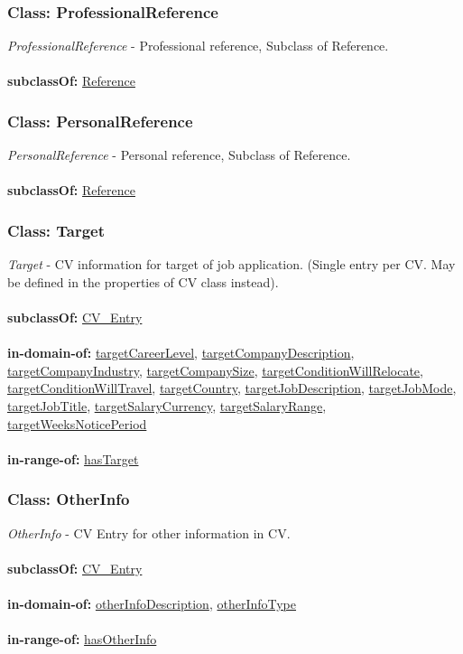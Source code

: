\documentclass[a4paper,12pt]{article}
\numberwithin{equation}{section}
\begin{document}
\subsubsection{Class: ProfessionalReference}\hypertarget{ProfessionalReference}{}
\textit{ProfessionalReference} - Professional reference, Subclass of Reference.
\\\\
\textbf{subclassOf:} \hyperlink{Reference}{Reference}

\subsubsection{Class: PersonalReference}\hypertarget{PersonalReference}{}
\textit{PersonalReference} - Personal reference, Subclass of Reference.
\\\\
\textbf{subclassOf:} \hyperlink{Reference}{Reference}

\subsubsection{Class: Target}\hypertarget{Target}{}
\textit{Target} - CV information for target of job application. (Single entry per CV. May be defined in the properties of CV class instead).
\\\\
\textbf{subclassOf:} \hyperlink{CV\_Entry}{CV\_Entry}
\\\\
\textbf{in-domain-of:} \hyperlink{targetCareerLevel}{targetCareerLevel}, \hyperlink{targetCompanyDescription}{targetCompanyDescription}, \hyperlink{targetCompanyIndustry}{targetCompanyIndustry}, \hyperlink{targetCompanySize}{targetCompanySize}, \hyperlink{targetConditionWillRelocate}{targetConditionWillRelocate}, \hyperlink{targetConditionWillTravel}{targetConditionWillTravel}, \hyperlink{targetCountry}{targetCountry}, \hyperlink{targetJobDescription}{targetJobDescription}, \hyperlink{targetJobMode}{targetJobMode}, \hyperlink{targetJobTitle}{targetJobTitle}, \hyperlink{targetSalaryCurrency}{targetSalaryCurrency}, \hyperlink{targetSalaryRange}{targetSalaryRange}, \hyperlink{targetWeeksNoticePeriod}{targetWeeksNoticePeriod}
\\\\
\textbf{in-range-of:} \hyperlink{hasTarget}{hasTarget}

\subsubsection{Class: OtherInfo}\hypertarget{OtherInfo}{}
\textit{OtherInfo} - CV Entry for other information in CV.
\\\\
\textbf{subclassOf:} \hyperlink{CV\_Entry}{CV\_Entry}
\\\\
\textbf{in-domain-of:} \hyperlink{otherInfoDescription}{otherInfoDescription}, \hyperlink{otherInfoType}{otherInfoType}
\\\\
\textbf{in-range-of:} \hyperlink{hasOtherInfo}{hasOtherInfo}
\end{document}
